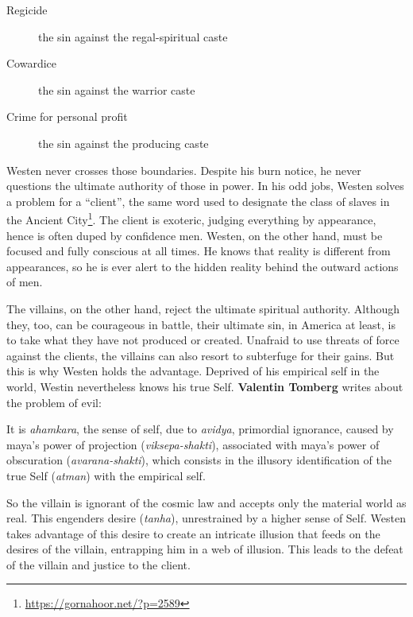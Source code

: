 \begin{description}

\item[Regicide]

the sin against the regal-spiritual caste
\item[Cowardice]

the sin against the warrior caste
\item[Crime for personal profit]

the sin against the producing caste
\end{description}


Westen never crosses those boundaries. Despite his burn notice, he never questions the ultimate authority of those in power. In his odd jobs, Westen solves a problem for a ``client'', the same word used to designate the class of slaves in the Ancient City\footnote{\url{https://gornahoor.net/?p=2589}}. The client is exoteric, judging everything by appearance, hence is often duped by confidence men. Westen, on the other hand, must be focused and fully conscious at all times. He knows that reality is different from appearances, so he is ever alert to the hidden reality behind the outward actions of men.

The villains, on the other hand, reject the ultimate spiritual authority. Although they, too, can be courageous in battle, their ultimate sin, in America at least, is to take what they have not produced or created. Unafraid to use threats of force against the clients, the villains can also resort to subterfuge for their gains. But this is why Westen holds the advantage. Deprived of his empirical self in the world, Westin nevertheless knows his true Self. \textbf{Valentin Tomberg} writes about the problem of evil:

\begin{quotex}
It is \emph{ahamkara}, the sense of self, due to \emph{avidya}, primordial ignorance, caused by maya's power of projection (\emph{viksepa-shakti}), associated with maya's power of obscuration (\emph{avarana-shakti}), which consists in the illusory identification of the true Self (\emph{atman}) with the empirical self.
\end{quotex}


So the villain is ignorant of the cosmic law and accepts only the material world as real. This engenders desire (\emph{tanha}), unrestrained by a higher sense of Self. Westen takes advantage of this desire to create an intricate illusion that feeds on the desires of the villain, entrapping him in a web of illusion. This leads to the defeat of the villain and justice to the client.

